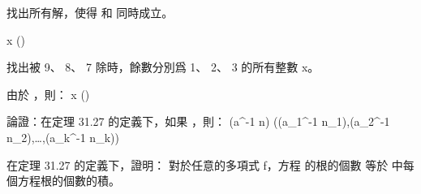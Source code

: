 \startsection[
  title={The Chinese remainder theorem},
]

\startEXERCISE
找出所有解，使得  和  同時成立。
\stopEXERCISE

\startANSWER
\startformula
x  ()
\stopformula

\stopANSWER

\startEXERCISE
找出被 9、 8、 7 除時，餘數分別爲 1、 2、 3 的所有整數 x。
\stopEXERCISE

\startANSWER
由於 ，則：
\startformula
x  ()
\stopformula
\stopANSWER

\startEXERCISE
論證：在定理 31.27 的定義下，如果 ，則：
\startformula
(a^{-1} \mod n) \leftrightarrow
  ((a_1^{-1} \mod n_1),(a_2^{-1} \mod n_2),\ldots,(a_k^{-1} \mod n_k))
\stopformula
\stopEXERCISE

\startANSWER
{}
\stopANSWER

\startEXERCISE[exercise:31.5-4]
在定理 31.27 的定義下，證明：
對於任意的多項式 f，方程  的根的個數
等於  中每個方程根的個數的積。
\stopEXERCISE

\startANSWER
{}
\stopANSWER

\stopsection
